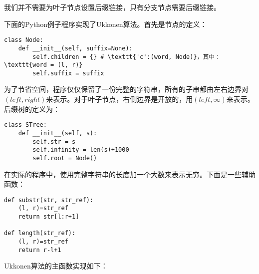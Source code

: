 \documentclass{ctexart}
\begin{document}
我们并不需要为叶子节点设置后缀链接，只有分支节点需要后缀链接。

下面的Python例子程序实现了Ukkonen算法。首先是节点的定义：

\lstset{language=Python}
\begin{lstlisting}
class Node:
    def __init__(self, suffix=None):
        self.children = {} # \texttt{'c':(word, Node)}，其中：\texttt{word = (l, r)}
        self.suffix = suffix
\end{lstlisting}

为了节省空间，程序仅仅保留了一份完整的字符串，所有的子串都由左右边界对$(left, right)$来表示。对于叶子节点，右侧边界是开放的，用$(left, \infty)$来表示。后缀树的定义为：

\begin{lstlisting}
class STree:
    def __init__(self, s):
        self.str = s
        self.infinity = len(s)+1000
        self.root = Node()
\end{lstlisting}

在实际的程序中，使用完整字符串的长度加一个大数来表示无穷。下面是一些辅助函数：

\begin{lstlisting}
def substr(str, str_ref):
    (l, r)=str_ref
    return str[l:r+1]

def length(str_ref):
    (l, r)=str_ref
    return r-l+1
\end{lstlisting}

Ukkonen算法的主函数实现如下：
\end{document}
